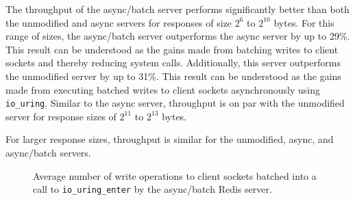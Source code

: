 \documentclass[sigconf]{acmart}
\newcommand{\inlinecode}[1]{\texttt{#1}}
\begin{document}

The throughput of the async/batch server performs significantly better than both the unmodified and async servers for responses of size $2^{6}$ to $2^{10}$ bytes.
For this range of sizes, the async/batch server outperforms the async server by up to 29\%.
This result can be understood as the gains made from batching writes to client sockets and thereby reducing system calls.
Additionally, this server outperforms the unmodified server by up to 31\%.
This result can be understood as the gains made from executing batched writes to client sockets asynchronously using \inlinecode{io\_uring}.
Similar to the async server, throughput is on par with the unmodified server for response sizes of $2^{11}$ to $2^{13}$ bytes.

For larger response sizes, throughput is similar for the unmodified, async, and async/batch servers.

\begin{figure}[h!]
\caption{Average number of write operations to client sockets batched into a call to \inlinecode{io\_uring\_enter} by the async/batch Redis server.}
\label{fig:writes_per_batch}
\end{figure}
\end{document}
